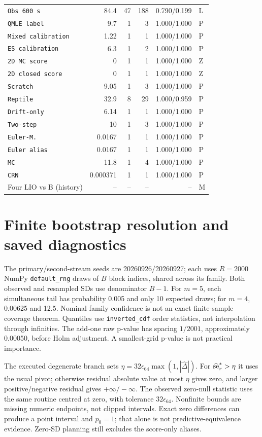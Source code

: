 \begin{longtable}{lrrrrl}
\texttt{Obs 600 s} & 84.4 & 47 & 188 & 0.790/0.199 & L\\
\texttt{QMLE label} & 9.7 & 1 & 3 & 1.000/1.000 & P\\
\texttt{Mixed calibration} & 1.22 & 1 & 1 & 1.000/1.000 & P\\
\texttt{ES calibration} & 6.3 & 1 & 2 & 1.000/1.000 & P\\
\texttt{2D MC score} & 0 & 1 & 1 & 1.000/1.000 & Z\\
\texttt{2D closed score} & 0 & 1 & 1 & 1.000/1.000 & Z\\
\texttt{Scratch} & 9.05 & 1 & 3 & 1.000/1.000 & P\\
\texttt{Reptile} & 32.9 & 8 & 29 & 1.000/0.959 & P\\
\texttt{Drift-only} & 6.14 & 1 & 1 & 1.000/1.000 & P\\
\texttt{Two-step} & 10 & 1 & 3 & 1.000/1.000 & P\\
\texttt{Euler-M.} & 0.0167 & 1 & 1 & 1.000/1.000 & P\\
\texttt{Euler alias} & 0.0167 & 1 & 1 & 1.000/1.000 & P\\
\texttt{MC} & 11.8 & 1 & 4 & 1.000/1.000 & P\\
\texttt{CRN} & 0.000371 & 1 & 1 & 1.000/1.000 & P\\
Four LIO vs B (history) & -- & -- & -- & -- & M\\
\end{longtable}


\section{Finite bootstrap resolution and saved diagnostics}
\label{sec:bootstrap-resolution}\hypertarget{sec:bootstrap-resolution}{}
The primary/second-stream seeds are 20260926/20260927; each uses \(R=2000\)
NumPy \texttt{default\_rng} draws of \(B\) block indices, shared across its
family. Both observed and resampled SDs use denominator \(B-1\).
For \(m=5\), each simultaneous tail has probability 0.005 and only 10
expected draws; for \(m=4\), 0.00625 and 12.5. Nominal family confidence
is not an exact finite-sample coverage theorem. Quantiles use
\texttt{inverted\_cdf} order statistics, not interpolation through infinities.
The add-one raw p-value has spacing \(1/2001\), approximately 0.00050,
before Holm adjustment. A smallest-grid p-value is not practical importance.

The executed degenerate branch sets
\(\eta=32\epsilon_{64}\max(1,|\widehat\Delta|)\). For
\(\widehat{\rm se}_r^*>\eta\) it uses the usual pivot; otherwise residual
absolute value at most \(\eta\) gives zero, and larger positive/negative
residual gives \(+\infty/-\infty\). The observed zero-null statistic uses
the same routine centred at zero, with tolerance \(32\epsilon_{64}\).
Nonfinite bounds are missing numeric endpoints, not clipped intervals.
Exact zero differences can produce a point interval and \(p_0=1\);
that alone is not predictive-equivalence evidence. Zero-SD planning still
excludes the score-only aliases.

